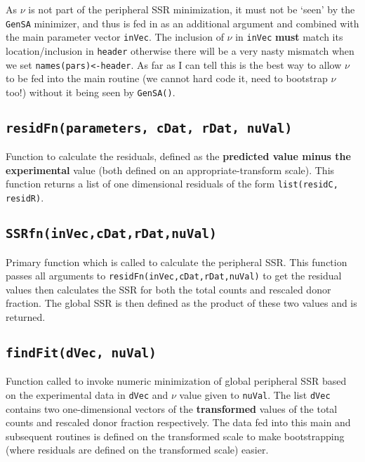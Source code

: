 \documentclass{tufte-book} %
\begin{document}
As $\nu$ is not part of the peripheral SSR minimization, it must not be `seen' by the \texttt{GenSA} minimizer, and thus is fed in as an additional argument and combined with the main parameter vector \texttt{inVec}. The inclusion of $\nu$ in \texttt{inVec} \textbf{must} match its location/inclusion in \texttt{header} otherwise there will be a very nasty mismatch when we set \texttt{names(pars)<-header}. As far as I can tell this is the best way to allow $\nu$ to be fed into the main routine (we cannot hard code it, need to bootstrap $\nu$ too!) without it being seen by \texttt{GenSA()}. 


\subsection{\texttt{residFn(parameters, cDat, rDat, nuVal)}}

Function to calculate the residuals, defined as the \textbf{predicted value minus the experimental} value (both defined on an appropriate-transform scale). This function returns a list of one dimensional residuals of the form \texttt{list(residC, residR)}. 
\subsection{\texttt{SSRfn(inVec,cDat,rDat,nuVal)}}

Primary function which is called to calculate the peripheral SSR. This function passes all arguments to \texttt{residFn(inVec,cDat,rDat,nuVal)} to get the residual values then calculates the SSR for both the total counts and rescaled donor fraction. The global SSR is then defined as the product of these two values and is returned.
\subsection{\texttt{findFit(dVec, nuVal)}}

Function called to invoke numeric minimization of global peripheral SSR based on the experimental data in \texttt{dVec} and $\nu$ value given to \texttt{nuVal}. The list \texttt{dVec} contains two one-dimensional vectors of the \textbf{transformed} values of the total counts and rescaled donor fraction respectively. The data fed into this main and subsequent routines is defined on the transformed scale to make bootstrapping (where residuals are defined on the transformed scale) easier.
\end{document}
